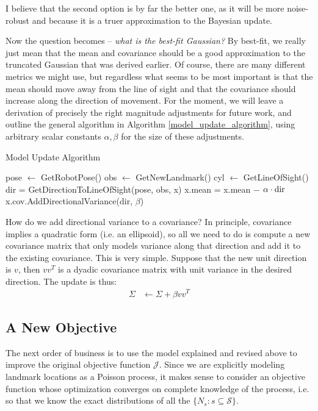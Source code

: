 \documentclass[12pt]{article}
\begin{document}
I believe that the second option is by far the better one, as it will be more noise-robust and because it is a truer approximation to the Bayesian update.

Now the question becomes -- \textit{what is the best-fit Gaussian?} By best-fit, we really just mean that the mean and covariance should be a good approximation to the truncated Gaussian that was derived earlier. Of course, there are many different metrics we might use, but regardless what seems to be most important is that the mean should move away from the line of sight and that the covariance should increase along the direction of movement. For the moment, we will leave a derivation of precisely the right magnitude adjustments for future work, and outline the general algorithm in Algorithm \ref{model_update_algorithm}, using arbitrary scalar constants $\alpha, \beta$ for the size of these adjustments.

\begin{algorithm}[H]
  \caption{Model Update Algorithm}
  \label{model_update_algorithm}
  \begin{algorithmic}
      \STATE pose $\leftarrow$ GetRobotPose()
      \STATE obs $\leftarrow$ GetNewLandmark()
      \STATE cyl $\leftarrow$ GetLineOfSight()
        \STATE dir = GetDirectionToLineOfSight(pose, obs, x)
        \STATE x.mean = x.mean $-$ $\alpha \cdot \textnormal{dir}$
        \STATE x.cov.AddDirectionalVariance(dir, $\beta$)
      \ENDFOR
    \ENDWHILE
  \end{algorithmic}
\end{algorithm}

How do we add directional variance to a covariance? In principle, covariance implies a quadratic form (i.e. an ellipsoid), so all we need to do is compute a new covariance matrix that only models variance along that direction and add it to the existing covariance. This is very simple. Suppose that the new unit direction is $v$, then $v v^T$ is a dyadic covariance matrix with unit variance in the desired direction. The update is thus:
\begin{align}
  \Sigma &\leftarrow \Sigma + \beta v v^T
\end{align}

\subsection{A New Objective}

The next order of business is to use the model explained and revised above to improve the original objective function $\mathcal{J}$. Since we are explicitly modeling landmark locations as a Poisson process, it makes sense to consider an objective function whose optimization converges on complete knowledge of the process, i.e. so that we know the exact distributions of all the $\{N_s : s \subseteq \mathcal{S}\}$.
\end{document}
